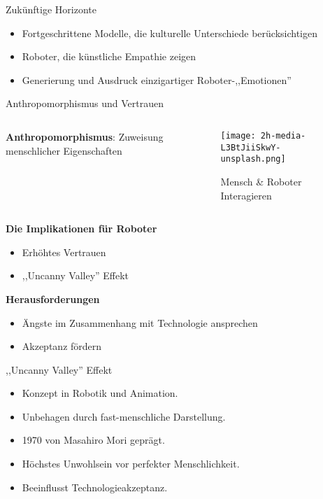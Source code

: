 \documentclass[aspectratio=169]{beamer}
\begin{document}
\begin{frame}{Zukünftige Horizonte}
  \begin{itemize}
    \item Fortgeschrittene Modelle, die kulturelle Unterschiede berücksichtigen
    \item Roboter, die künstliche Empathie zeigen
    \item Generierung und Ausdruck einzigartiger Roboter-,,Emotionen''
  \end{itemize}
\end{frame}

\begin{frame}{Anthropomorphismus und Vertrauen}
  \begin{columns}
    \begin{column}{.5\textwidth}
      \textbf{Anthropomorphismus}: Zuweisung menschlicher Eigenschaften
    \end{column}
    \begin{column}{.5\textwidth}
      \begin{figure}[h]
        \centering
        \texttt{[image: 2h-media-L3BtJiiSkwY-unsplash.png]}
        \caption{Mensch \& Roboter Interagieren}
      \end{figure}
    \end{column}
  \end{columns}

  \textbf{Die Implikationen für Roboter}
  \begin{itemize}
    \item Erhöhtes Vertrauen
    \item ,,Uncanny Valley'' Effekt
  \end{itemize}
  \vspace{.5cm}

  \textbf{Herausforderungen}
  \begin{itemize}
    \item Ängste im Zusammenhang mit Technologie ansprechen
    \item Akzeptanz fördern
  \end{itemize}

\end{frame}

\begin{frame}{,,Uncanny Valley'' Effekt}
  \begin{itemize}
    \item Konzept in Robotik und Animation.
    \item Unbehagen durch fast-menschliche Darstellung.
    \item 1970 von Masahiro Mori geprägt.
    \item Höchstes Unwohlsein vor perfekter Menschlichkeit.
    \item Beeinflusst Technologieakzeptanz.
  \end{itemize}
\end{frame}
\end{document}
